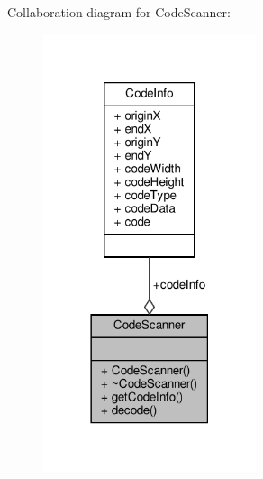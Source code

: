 Collaboration diagram for Code\+Scanner\+:
\nopagebreak
\begin{figure}[H]
\begin{center}
\leavevmode
\includegraphics[width=177pt]{class_code_scanner__coll__graph}
\end{center}
\end{figure}
